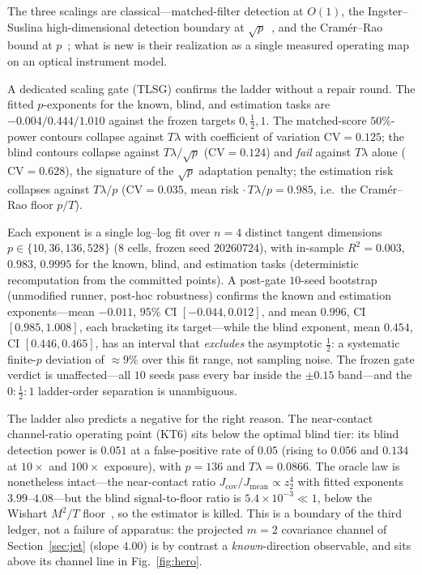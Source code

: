 \documentclass[10pt,twocolumn]{article}
\theoremstyle{plain}
\theoremstyle{definition}
\begin{document}
The three scalings are classical---matched-filter detection at $O(1)$, the
Ingster--Suslina high-dimensional detection boundary at $\sqrt
p$~\cite{IngsterSuslina,DiakonikolasKane}, and the Cram\'er--Rao bound at
$p$~\cite{Vaart}; what is new is their realization as a single measured operating map
on an optical instrument model.

A dedicated scaling gate (TLSG) confirms the ladder without a repair round. The
fitted $p$-exponents for the known, blind, and estimation tasks are
$-0.004/0.444/1.010$ against the frozen targets $0,\tfrac12,1$. The matched-score
$50\%$-power contours collapse against $T\lambda$ with coefficient of variation
$\mathrm{CV}=0.125$; the blind contours collapse against $T\lambda/\sqrt p$
($\mathrm{CV}=0.124$) and \emph{fail} against $T\lambda$ alone ($\mathrm{CV}=0.628$),
the signature of the $\sqrt p$ adaptation penalty; the estimation risk collapses
against $T\lambda/p$ ($\mathrm{CV}=0.035$, mean risk $\cdot\,T\lambda/p=0.985$,
i.e.\ the Cram\'er--Rao floor $p/T$).

Each exponent is a single log--log fit over $n=4$ distinct tangent dimensions
$p\in\{10,36,136,528\}$ ($8$ cells, frozen seed $20260724$), with in-sample
$R^2=0.003$, $0.983$, $0.9995$ for the known, blind, and estimation tasks
(deterministic recomputation from the committed points). A post-gate $10$-seed
bootstrap (unmodified runner, post-hoc robustness) confirms the known and estimation
exponents---mean $-0.011$, $95\%$ CI $[-0.044,0.012]$, and mean $0.996$, CI
$[0.985,1.008]$, each bracketing its target---while the blind exponent, mean $0.454$,
CI $[0.446,0.465]$, has an interval that \emph{excludes} the asymptotic $\tfrac12$: a
systematic finite-$p$ deviation of $\approx9\%$ over this fit range, not sampling
noise. The frozen gate verdict is unaffected---all $10$ seeds pass every bar inside
the $\pm0.15$ band---and the $0:\tfrac12:1$ ladder-order separation is unambiguous.

The ladder also predicts a negative for the right reason. The near-contact
channel-ratio operating point (KT6) sits below the optimal blind tier: its blind
detection power is $0.051$ at a false-positive rate of $0.05$ (rising to $0.056$ and
$0.134$ at $10\times$ and $100\times$ exposure), with $p=136$ and $T\lambda=0.0866$.
The oracle law is nonetheless intact---the near-contact ratio $J_{\mathrm{cov}}/
J_{\mathrm{mean}}\propto z_2^4$ with fitted exponents $3.99$--$4.08$---but the blind
signal-to-floor ratio is $5.4\times10^{-3}\ll1$, below the Wishart $M^2/T$
floor~\cite{BBP}, so
the estimator is killed. This is a boundary of the third ledger, not a failure of
apparatus: the projected $m=2$ covariance channel of Section~\ref{sec:jet} (slope
$4.00$) is by contrast a \emph{known}-direction observable, and sits above its
channel line in Fig.~\ref{fig:hero}.
\end{document}
